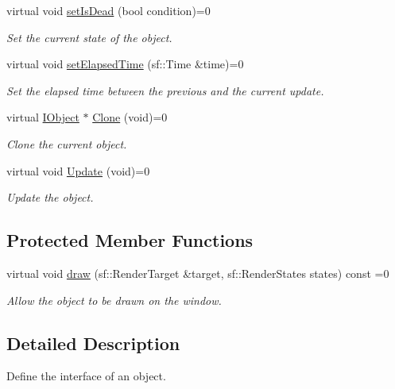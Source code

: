 \begin{DoxyCompactItemize}
virtual void \hyperlink{class_graphics_1_1_i_object_a55f6f70a2c0c2690b6b6a78a75ece3fb}{set\+Is\+Dead} (bool condition)=0
\begin{DoxyCompactList}\small\item\em Set the current state of the object. \end{DoxyCompactList}\item 
virtual void \hyperlink{class_graphics_1_1_i_object_af8866f1765a721c230556bfa391d0299}{set\+Elapsed\+Time} (sf\+::\+Time \&time)=0
\begin{DoxyCompactList}\small\item\em Set the elapsed time between the previous and the current update. \end{DoxyCompactList}\item 
virtual \hyperlink{class_graphics_1_1_i_object}{I\+Object} $\ast$ \hyperlink{class_graphics_1_1_i_object_a1f863b90e0b37e462c487731cc218fdd}{Clone} (void)=0
\begin{DoxyCompactList}\small\item\em Clone the current object. \end{DoxyCompactList}\item 
\hypertarget{class_graphics_1_1_i_object_a45b5308a10381dd4f41faeef2d06f46c}{}virtual void \hyperlink{class_graphics_1_1_i_object_a45b5308a10381dd4f41faeef2d06f46c}{Update} (void)=0\label{class_graphics_1_1_i_object_a45b5308a10381dd4f41faeef2d06f46c}

\begin{DoxyCompactList}\small\item\em Update the object. \end{DoxyCompactList}\end{DoxyCompactItemize}
\subsection*{Protected Member Functions}
\begin{DoxyCompactItemize}
\item 
virtual void \hyperlink{class_graphics_1_1_i_object_a1bbb236da76f9cff3750afb768be6260}{draw} (sf\+::\+Render\+Target \&target, sf\+::\+Render\+States states) const  =0
\begin{DoxyCompactList}\small\item\em Allow the object to be drawn on the window. \end{DoxyCompactList}\end{DoxyCompactItemize}


\subsection{Detailed Description}
Define the interface of an object. 

